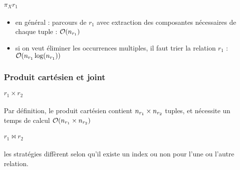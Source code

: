 		
		\paragraph{$\pi_Xr_1$}
		
		\begin{itemize}
			\item en général : parcours de $r_1$ avec extraction des composantes nécessaires de chaque tuple : $\mathcal{O} (n_{r_1})$
			\item si on veut éliminer les occurrences multiples, il faut trier la relation $r_1$ : $\mathcal{O}(n_{r_1} \log (n_{r_1}))$
		\end{itemize}		
		
		\subsubsection{Produit cartésien et joint}
		
		\paragraph{$r_1 \times r_2$} Par définition, le produit cartésien contient $n_{r_1} \times n_{r_2}$ tuples, et nécessite un temps de calcul $\mathcal{O} (n_{r_1} \times n_{r_2})$
		
		\paragraph{$r_1 \Join r_2$} les stratégies diffèrent selon qu'il existe un index ou non pour l'une ou l'autre relation.
		

